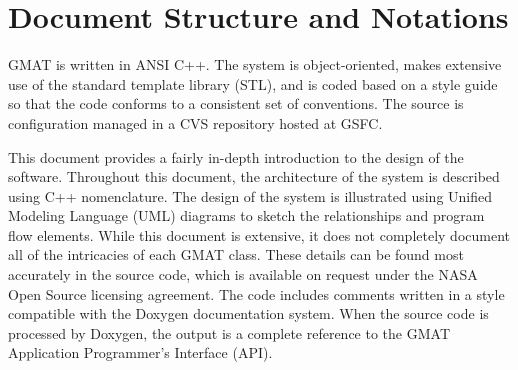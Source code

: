 \section{Document Structure and Notations}

GMAT is written in ANSI C++.  The system is object-oriented, makes extensive use of the standard
template library (STL), and is coded based on a style guide\cite{shoan} so that the code conforms to
a consistent set of conventions.  The source is configuration managed in a CVS repository hosted at
GSFC.

This document provides a fairly in-depth introduction to the design of the software.  Throughout
this document, the architecture of the system is described using C++ nomenclature.  The design of
the system is illustrated using Unified Modeling Language (UML) diagrams to sketch the relationships
and program flow elements.  While this document is extensive, it does not completely document all
of the intricacies of each GMAT class.  These details can be found most accurately in the source
code, which is available on request under the NASA Open Source licensing agreement.  The code
includes comments written in a style compatible with the Doxygen documentation system.  When the
source code is processed by Doxygen, the output is a complete reference to the GMAT Application
Programmer's Interface (API).

